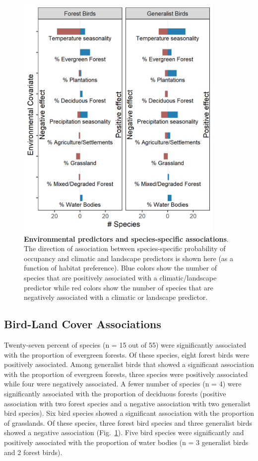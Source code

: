 \begin{figure}[h!]
    \centering
    \includegraphics[width=0.9\textwidth]{figures/hillybirds/fig_04.png}
    \caption{
        \textbf{Environmental predictors and species-specific associations}.
        The direction of association between species-specific probability of occupancy and climatic and landscape predictors is shown here (as a function of habitat preference). 
        Blue colors show the number of species that are positively associated with a climatic/landscape predictor while red colors show the number of species that are negatively associated with a climatic or landscape predictor.
    }
    \label{hilly_fig_04}
\end{figure}

\subsection*{Bird-Land Cover Associations}

Twenty-seven percent of species (n = 15 out of 55) were significantly associated with the proportion of evergreen forests.
Of these species, eight forest birds were positively associated.
Among generalist birds that showed a significant association with the proportion of evergreen forests, three species were positively associated while four were negatively associated.
A fewer number of species (n = 4) were significantly associated with the proportion of deciduous forests (positive association with two forest species and a negative association with two generalist bird species).
Six bird species showed a significant association with the proportion of grasslands.
Of these species, three forest bird species and three generalist birds showed a negative association (Fig.~\ref{hilly_fig_04}).
Five bird species were significantly and positively associated with the proportion of water bodies (n = 3 generalist birds and 2 forest birds).

